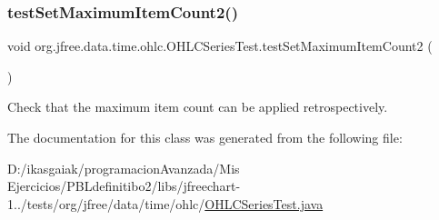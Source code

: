 \subsubsection{\texorpdfstring{test\+Set\+Maximum\+Item\+Count2()}{testSetMaximumItemCount2()}}
{\footnotesize\ttfamily void org.\+jfree.\+data.\+time.\+ohlc.\+O\+H\+L\+C\+Series\+Test.\+test\+Set\+Maximum\+Item\+Count2 (\begin{DoxyParamCaption}{ }\end{DoxyParamCaption})}

Check that the maximum item count can be applied retrospectively. 

The documentation for this class was generated from the following file\+:\begin{DoxyCompactItemize}
\item 
D\+:/ikasgaiak/programacion\+Avanzada/\+Mis Ejercicios/\+P\+B\+Ldefinitibo2/libs/jfreechart-\/1../tests/org/jfree/data/time/ohlc/\mbox{\hyperlink{_o_h_l_c_series_test_8java}{O\+H\+L\+C\+Series\+Test.\+java}}\end{DoxyCompactItemize}
